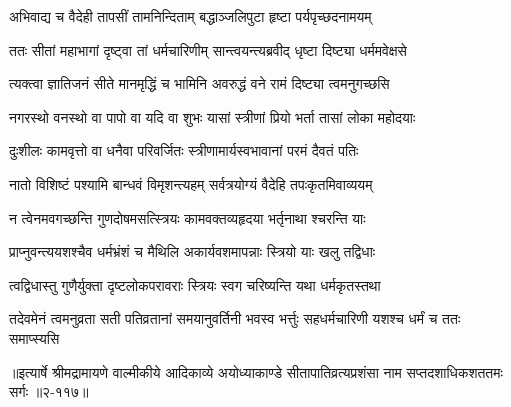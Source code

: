 \twolineshloka
{अभिवाद्य च वैदेही तापसीं तामनिन्दिताम्}
{बद्धाञ्जलिपुटा हृष्टा पर्यपृच्छदनामयम्} %

\twolineshloka
{ततः सीतां महाभागां दृष्ट्वा तां धर्मचारिणीम्}
{सान्त्वयन्त्यब्रवीद् धृष्टा दिष्ट्या धर्ममवेक्षसे} %

\twolineshloka
{त्यक्त्वा ज्ञातिजनं सीते मानमृद्धिं च भामिनि}
{अवरुद्धं वने रामं दिष्ट्या त्वमनुगच्छसि} %

\twolineshloka
{नगरस्थो वनस्थो वा पापो वा यदि वा शुभः}
{यासां स्त्रीणां प्रियो भर्ता तासां लोका महोदयाः} %

\twolineshloka
{दुःशीलः कामवृत्तो वा धनैवा परिवर्जितः}
{स्त्रीणामार्यस्वभावानां परमं दैवतं पतिः} %

\twolineshloka
{नातो विशिष्टं पश्यामि बान्धवं विमृशन्त्यहम्}
{सर्वत्रयोग्यं वैदेहि तपःकृतमिवाव्ययम्} %

\twolineshloka
{न त्वेनमवगच्छन्ति गुणदोषमसत्स्त्रियः}
{कामवक्तव्यहृदया भर्तृनाथा श्चरन्ति याः} %

\twolineshloka
{प्राप्नुवन्त्ययशश्चैव धर्मभ्रंशं च मैथिलि}
{अकार्यवशमापन्नाः स्त्रियो याः खलु तद्विधाः} %

\twolineshloka
{त्वद्विधास्तु गुणैर्युक्ता दृष्टलोकपरावराः}
{स्त्रियः स्वग चरिष्यन्ति यथा धर्मकृतस्तथा} %

\twolineshloka
{तदेवमेनं त्वमनुव्रता सती पतिव्रतानां समयानुवर्तिनी}
{भवस्व भर्त्तुः सहधर्मचारिणी यशश्च धर्मं च ततः समाप्स्यसि} %


॥इत्यार्षे श्रीमद्रामायणे वाल्मीकीये आदिकाव्ये अयोध्याकाण्डे सीतापातिव्रत्यप्रशंसा नाम सप्तदशाधिकशततमः सर्गः ॥२-११७॥
